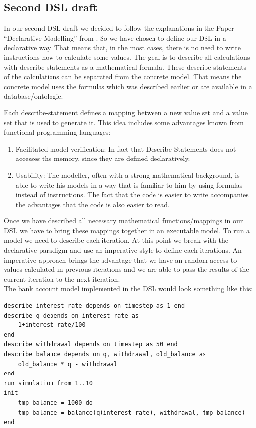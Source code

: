 \subsection{Second DSL draft} \label{sec:second_dsl_draft}
\par
In our second DSL draft we decided to follow the explanations in the Paper ``Declarative Modelling'' from \autocite{dsl:muetzelfeldt}. So we have chosen to define our DSL in a declarative way. That means that, in the most cases, there is no need to write instructions how to calculate some values. The goal is to describe all calculations with describe statements as a mathematical formula. These describe-statements of the calculations can be separated from the concrete model. That means the concrete model uses the formulas which was described earlier or are available in a database/ontologie.
\par
Each describe-statement defines a mapping between a new value set and a value set that is used to generate it. This idea includes some advantages known from functional programming languages:
\begin{enumerate}
	\item Facilitated model verification: In fact that Describe Statements does not accesses the memory, since they are defined declaratively.
	\item Usability: The modeller, often with a strong mathematical background, is able to write his models in a way that is familiar to him by using formulas instead of instructions. The fact that the code is easier to write accompanies the advantages that the code is also easier to read.
\end{enumerate}
Once we have described all necessary mathematical functions/mappings in our DSL we have to bring these mappings together in an executable model. To run a model  we need to describe each iteration. At this point we break with the declarative paradigm and use an imperative style to define each iterations. An imperative approach brings the advantage that we have an random access to values calculated in previous iterations and we are able to pass the results of the current iteration to the next iteration. \\
The bank account model implemented in the DSL would look something like this:
\begin{lstlisting}[language=secondDSL]
describe interest_rate depends on timestep as 1 end
describe q depends on interest_rate as
	1+interest_rate/100
end
describe withdrawal depends on timestep as 50 end
describe balance depends on q, withdrawal, old_balance as
	old_balance * q - withdrawal
end
run simulation from 1..10
init 
	tmp_balance = 1000 do
	tmp_balance = balance(q(interest_rate), withdrawal, tmp_balance)
end
\end{lstlisting}
